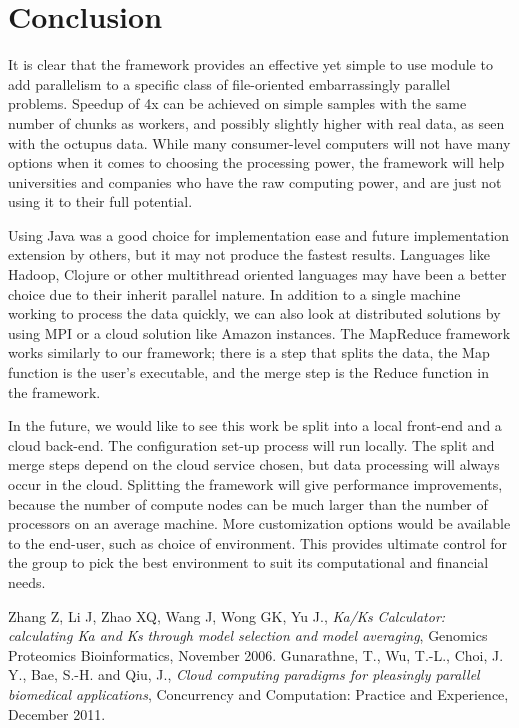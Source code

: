 \documentclass[12pt]{article}
\begin{document}
\section{Conclusion}

It is clear that the framework provides an effective yet simple to use module to
add parallelism to a specific class of file-oriented embarrassingly parallel
problems. Speedup of 4x can be achieved on simple samples with the same number
of chunks as workers, and possibly slightly higher with real data, as seen with
the octupus data. While many consumer-level computers will not have many options
when it comes to choosing the processing power, the framework will help
universities and companies who have the raw computing power, and are just not
using it to their full potential. 

Using Java was a good choice for implementation ease and future implementation
extension by others, but it may not produce the fastest results. Languages like
Hadoop, Clojure or other multithread oriented languages may have been a better
choice due to their inherit parallel nature. In addition to a single machine
working to process the data quickly, we can also look at distributed solutions
by using MPI or a cloud solution like Amazon instances. The MapReduce framework
works similarly to our framework; there is a step that splits the data, the Map
function is the user's executable, and the merge step is the Reduce function in
the framework. 

In the future, we would like to see this work be split into a local front-end
and a cloud back-end. The configuration set-up process will run locally. The
split and merge steps depend on the cloud service chosen, but data processing
will always occur in the cloud. Splitting the framework will give performance
improvements, because the number of compute nodes can be much larger than the
number of processors on an average machine. More customization options would be
available to the end-user, such as choice of environment. This provides ultimate
control for the group to pick the best environment to suit its computational and
financial needs.

\begin{thebibliography}{1}
Zhang Z, Li J, Zhao XQ, Wang J, Wong GK, Yu J., \emph{Ka/Ks Calculator: 
calculating Ka and Ks through model selection and model averaging},
Genomics Proteomics Bioinformatics, November 2006.
Gunarathne, T., Wu, T.-L., Choi, J. Y., Bae, S.-H. and Qiu, J., \emph{Cloud
computing paradigms for pleasingly parallel biomedical applications},
Concurrency and Computation: Practice and Experience, December 2011.
\end{thebibliography}
\end{document}
